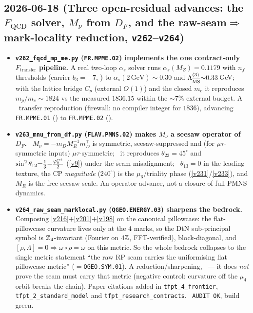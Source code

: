 \subsection*{2026-06-18 (Three open-residual advances: the $F_{\mathrm{QCD}}$ solver, $M_\nu$ from $D_F$, and the raw-seam$\Rightarrow$mark-locality reduction, \texttt{v262}--\texttt{v264})}
\begin{itemize}
\item \textbf{\texttt{v262\_fqcd\_mp\_me.py} (\texttt{FR.MPME.02}) implements the one contract-only
  $F_{\mathrm{transfer}}$ pipeline.} A real two-loop $\alpha_s$ solver runs $\alpha_s(M_Z){=}0.1179$ with
  $n_f$ thresholds (carrier $b_3{=}-7$, \mE) to $\alpha_s(2\,\text{GeV}){\sim}0.30$ and
  $\Lambda^{(3)}_{\overline{\rm MS}}{\sim}0.33$\,GeV; with the lattice bridge $C_p$ (external $O(1)$) and the
  closed $m_e$ it reproduces $m_p/m_e{\sim}1824$ vs the measured $1836.15$ within the $\sim7\%$ external
  budget. A \mC\ transfer reproduction (firewall: no compiler integer for $1836$), advancing
  \texttt{FR.MPME.01} (\mO) to \texttt{FR.MPME.02} (\mC).
\item \textbf{\texttt{v263\_mnu\_from\_df.py} (\texttt{FLAV.PMNS.02}) makes $M_\nu$ a seesaw operator of
  $D_F$.} \mE\ $M_\nu=-m_D M_R^{-1} m_D^\top$ is symmetric, seesaw-suppressed and (for $\mu\tau$-symmetric
  inputs) $\mu\tau$-symmetric; \mC\ it reproduces $\theta_{23}{=}45^\circ$ and
  $\sin^2\theta_{12}{=}\tfrac13{-}\tfrac{\varphi_0^{\mathrm{ret}}}{2}$ (\vref{v9}) under the seam misalignment; \mO\
  $\theta_{13}{=}0$ in the leading texture, the CP \emph{magnitude} ($240^\circ$) is the $\mu_6$/triality
  phase (\vref{v231}/\vref{v233}), and $M_R$ is the free seesaw scale. An operator advance, not a closure
  of full PMNS dynamics.
\item \textbf{\texttt{v264\_raw\_seam\_marklocal.py} (\texttt{QGEO.ENERGY.03}) sharpens the bedrock.}
  Composing \vref{v216}$+$\vref{v201}$+$\vref{v198} on the canonical pillowcase: the flat-pillowcase
  curvature lives only at the $4$ marks, so the DtN sub-principal symbol is $\mathbb{Z}_4$-invariant (Fourier on
  $4\mathbb{Z}$, FFT-verified), block-diagonal, and $[\rho,\Lambda]{=}0\Rightarrow\omega\circ\rho{=}\omega$ on this
  metric. So the whole bedrock collapses to the single metric statement ``the raw RP seam carries the
  uniformising flat pillowcase metric'' ($=$\texttt{QGEO.SYM.01}). A reduction/sharpening, \mO\ --- it does
  \emph{not} prove the seam must carry that metric (negative control: curvature off the $\mu_4$ orbit breaks
  the chain). Paper citations added in \texttt{tfpt\_4\_frontier}, \texttt{tfpt\_2\_standard\_model} and
  \texttt{tfpt\_research\_contracts}. \mE\ \texttt{AUDIT OK}, build green.
\end{itemize}


